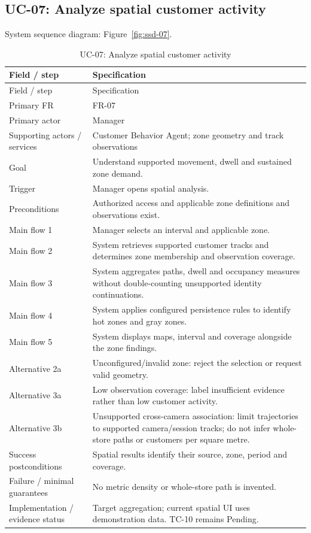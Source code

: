 \subsection*{UC-07: Analyze spatial customer activity}
\label{uc:07}
System sequence diagram: Figure~\ref{fig:ssd-07}.

\begin{longtable}{P{0.23\textwidth}P{0.67\textwidth}}
\caption{UC-07: Analyze spatial customer activity}\\
\toprule
Field / step & Specification\\
\midrule
\endfirsthead
\toprule
Field / step & Specification\\
\midrule
\endhead
Primary FR & FR-07\\
Primary actor & Manager\\
Supporting actors / services & Customer Behavior Agent; zone geometry and track observations\\
Goal & Understand supported movement, dwell and sustained zone demand.\\
Trigger & Manager opens spatial analysis.\\
Preconditions & Authorized access and applicable zone definitions and observations exist.\\
Main flow 1 & Manager selects an interval and applicable zone.\\
Main flow 2 & System retrieves supported customer tracks and determines zone membership and observation coverage.\\
Main flow 3 & System aggregates paths, dwell and occupancy measures without double-counting unsupported identity continuations.\\
Main flow 4 & System applies configured persistence rules to identify hot zones and gray zones.\\
Main flow 5 & System displays maps, interval and coverage alongside the zone findings.\\
Alternative 2a & Unconfigured/invalid zone: reject the selection or request valid geometry.\\
Alternative 3a & Low observation coverage: label insufficient evidence rather than low customer activity.\\
Alternative 3b & Unsupported cross-camera association: limit trajectories to supported camera/session tracks; do not infer whole-store paths or customers per square metre.\\
Success postconditions & Spatial results identify their source, zone, period and coverage.\\
Failure / minimal guarantees & No metric density or whole-store path is invented.\\
Implementation / evidence status & Target aggregation; current spatial UI uses demonstration data. TC-10 remains Pending.\\
\bottomrule
\end{longtable}

